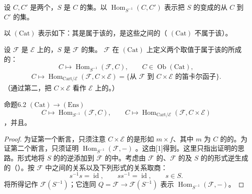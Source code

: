 设 $C,C'$ 是两个，$S$ 是 $C$ 的集。以 $\operatorname{Hom}_{S^{-1}}(C,C')$ 表示把 $S$ 的变成的从 $C$ 到 $C'$ 的集。

以 $(\mathrm{Cat})$ 表示如下：其是属于该的，是这些之间的（ $(\mathrm{Cat})$ 不属于该）。

设 $\mathscr F$ 是 $\mathscr E$ 上的，$S$ 是 $\mathscr F$ 的集。 $\mathscr F$ 在 $(\mathrm{Cat})$ 上定义两个取值于属于该的所成的：
\[
C\longmapsto\operatorname{Hom}_{S^{-1}}(\mathscr F,C),\qquad C\in\operatorname{Ob}(\mathrm{Cat}),
\]
\[
\begin{aligned}
C\longmapsto\operatorname{Hom}_{\mathrm{Cart}/\mathscr E}(\mathscr F,C\times\mathscr E)
=\{\text{从 $\mathscr F$ 到 $C\times\mathscr E$ 的笛卡尔函子}\}.
\end{aligned}
\]
（通过第二，把 $C\times\mathscr E$ 看作 $\mathscr E$ 上的。）

\begin{SGAresult}{命题}{6.2}
 $(\mathrm{Cat})\to(\mathrm{Ens})$
\[
C\longmapsto\operatorname{Hom}_{S^{-1}}(\mathscr F,C),\qquad
C\longmapsto\operatorname{Hom}_{\mathrm{Cart}/\mathscr E}(\mathscr F,C\times\mathscr E)
\]
，并且。
\end{SGAresult}
\begin{proof}
为证第一个断言，只须注意 $C\times\mathscr E$ 的是形如 $m\times f$、其中 $m$ 为 $C$ 的的。为证第二个断言，只须证明 $\operatorname{Hom}_{S^{-1}}(\mathscr F,-)$ 。这由[1]得到。这里只指出证明的思路。形式地将 $S$ 的的逆添加到 $\mathscr F$ 的中。考虑由 $\mathscr F$ 的、$\mathscr F$ 的及 $S$ 的的形式逆生成的（）。按 $\mathscr F$ 中之间的关系以及下列形式的关系取商：
\[
s^{-1}s=\operatorname{id},\qquad ss^{-1}=\operatorname{id},\qquad s\in S.
\]
将所得记作 $\mathscr F(S^{-1})$；它连同 $Q=\mathscr F\to\mathscr F(S^{-1})$ 表示 $\operatorname{Hom}_{S^{-1}}(\mathscr F,-)$。
\end{proof}

